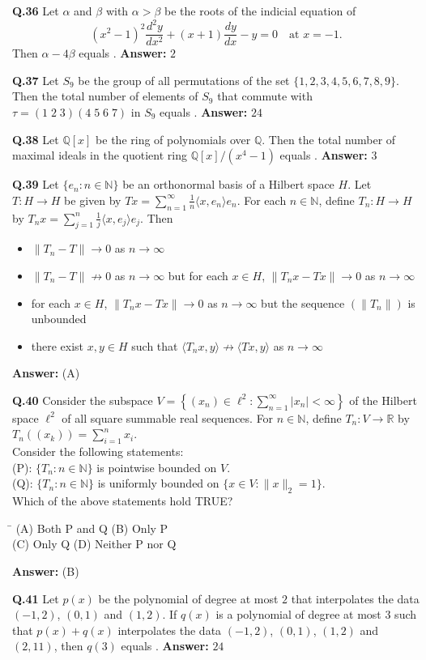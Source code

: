 \documentclass[11pt,a4paper]{article}
\newcommand{\optsfourA}[4]{%
  \begin{tabbing}
    \hspace{0.48\linewidth}\=\kill
    (A) #1 \> (B) #2 \\[2pt]
    (C) #3 \> (D) #4
  \end{tabbing}%
}
\newcommand{\optslistA}[4]{%
  \begin{itemize}
    \setlength{\itemsep}{2pt}\setlength{\parskip}{0pt}
    \item[(A)] #1
    \item[(B)] #2
    \item[(C)] #3
    \item[(D)] #4
  \end{itemize}%
}
\newcommand{\ans}[1]{\textbf{Answer:} #1\par\medskip}
\begin{document}
\textbf{Q.36} Let $\alpha$ and $\beta$ with $\alpha > \beta$ be the roots of the indicial equation of
\[
  (x^2 - 1)^2 \frac{d^2 y}{dx^2} + (x + 1)\frac{dy}{dx} - y = 0 \quad \text{at } x = -1.
\]
Then $\alpha - 4\beta$ equals \underline{\hspace{2cm}}.
\ans{$2$}

\textbf{Q.37} Let $S_9$ be the group of all permutations of the set $\{1, 2, 3, 4, 5, 6, 7, 8, 9\}$. Then the total number of elements of $S_9$ that commute with $\tau = (1\; 2\; 3)(4\; 5\; 6\; 7)$ in $S_9$ equals \underline{\hspace{2cm}}.
\ans{$24$}

\textbf{Q.38} Let $\mathbb{Q}[x]$ be the ring of polynomials over $\mathbb{Q}$. Then the total number of maximal ideals in the quotient ring $\mathbb{Q}[x] / (x^4 - 1)$ equals \underline{\hspace{2cm}}.
\ans{$3$}

\textbf{Q.39} Let $\{e_n : n \in \mathbb{N}\}$ be an orthonormal basis of a Hilbert space $H$. Let $T : H \to H$ be given by $Tx = \displaystyle\sum_{n=1}^{\infty} \frac{1}{n} \langle x, e_n \rangle e_n$. For each $n \in \mathbb{N}$, define $T_n : H \to H$ by $T_n x = \displaystyle\sum_{j=1}^{n} \frac{1}{j} \langle x, e_j \rangle e_j$. Then
\optslistA{$\|T_n - T\| \to 0$ as $n \to \infty$}{$\|T_n - T\| \nrightarrow 0$ as $n \to \infty$ but for each $x \in H$, $\|T_n x - Tx\| \to 0$ as $n \to \infty$}{for each $x \in H$, $\|T_n x - Tx\| \to 0$ as $n \to \infty$ but the sequence $(\|T_n\|)$ is unbounded}{there exist $x, y \in H$ such that $\langle T_n x, y \rangle \nrightarrow \langle Tx, y \rangle$ as $n \to \infty$}
\ans{(A)}

\textbf{Q.40} Consider the subspace $V = \left\{(x_n) \in \ell^2 : \sum_{n=1}^{\infty} |x_n| < \infty\right\}$ of the Hilbert space $\ell^2$ of all square summable real sequences. For $n \in \mathbb{N}$, define $T_n : V \to \mathbb{R}$ by $T_n((x_k)) = \displaystyle\sum_{i=1}^{n} x_i$.\\
Consider the following statements:\\
(P): $\{T_n : n \in \mathbb{N}\}$ is pointwise bounded on $V$.\\
(Q): $\{T_n : n \in \mathbb{N}\}$ is uniformly bounded on $\{x \in V : \|x\|_2 = 1\}$.\\
Which of the above statements hold TRUE?
\optsfourA{Both P and Q}{Only P}{Only Q}{Neither P nor Q}
\ans{(B)}

\textbf{Q.41} Let $p(x)$ be the polynomial of degree at most $2$ that interpolates the data $(-1, 2)$, $(0, 1)$ and $(1, 2)$. If $q(x)$ is a polynomial of degree at most $3$ such that $p(x) + q(x)$ interpolates the data $(-1, 2)$, $(0, 1)$, $(1, 2)$ and $(2, 11)$, then $q(3)$ equals \underline{\hspace{2cm}}.
\ans{$24$}
\end{document}
